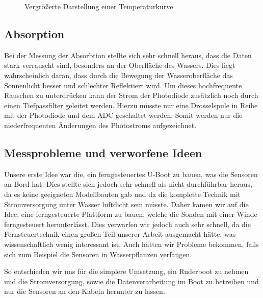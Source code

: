 \documentclass[12pt,a4paper,titlepage,headinclude,bibtotoc]{scrartcl}
\begin{document}
\begin{figure}[h]
	\centering
	
	\caption{Vergrößerte Darstellung einer Temperaturkurve.}
	\label{fig:tempSprung}
\end{figure}



\subsection{Absorption}
Bei der Messung der Absorbtion stellte sich sehr schnell heraus, dass die Daten stark verrauscht sind, besonders an der Oberfläche des Wassers.
Dies liegt wahrscheinlich daran, dass durch die Bewegung der Wasseroberfläche das Sonnenlicht besser und schlechter Reflektiert wird.
Um dieses hochfrequente Rauschen zu unterdrücken kann der Strom der Photodiode zusätzlich noch durch einen Tiefpassfilter geleitet werden.
Hierzu müsste nur eine Drosselspule in Reihe mit der Photodiode und dem ADC geschaltet werden.
Somit werden nur die niederfrequenten Änderungen des Photostroms aufgezeichnet.


\subsection{Messprobleme und verworfene Ideen}
Unsere erste Idee war die, ein ferngesteuertes U-Boot zu bauen, was die Sensoren an Bord hat.
Dies stellte sich jedoch sehr schnell als nicht durchführbar heraus, da es keine geeigneten Modellbauten gab und da die komplette Technik mit Stromversorgung unter Wasser luftdicht sein müsste.
Daher kamen wir auf die Idee, eine ferngesteuerte Plattform zu bauen, welche die Sonden mit einer Winde ferngesteuert herunterlässt.
Dies verwarfen wir jedoch auch sehr schnell, da die Fernsteuertechnik einen großen Teil unserer Arbeit ausgemacht hätte, was wissenschaftlich wenig interessant ist.
Auch hätten wir Probleme bekommen, falls sich zum Beispiel die Sensoren in Wasserpflanzen verfangen.

So entschieden wir uns für die simplere Umsetzung, ein Ruderboot zu nehmen und die Stromversorgung, sowie die Datenverarbeitung im Boot zu betreiben und nur die Sensoren an den Kabeln herunter zu lassen.
\end{document}
